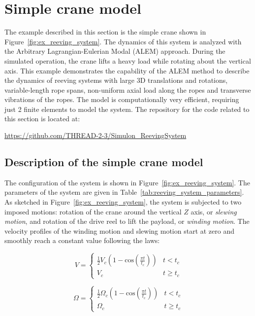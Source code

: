 \section{Simple crane model}\label{sec:craneSimulon}
The example described in this section is the simple crane shown in Figure~\ref{fig:ex_reeving_system}. The dynamics of this system is analyzed with the Arbitrary Lagrangian-Eulerian Modal (ALEM) approach. During the simulated operation, the crane lifts a heavy load while rotating about the vertical axis. This example demonstrates the capability of the ALEM method to describe the dynamics of reeving systems with large 3D translations and rotations, variable-length rope spans, non-uniform axial load along the ropes and transverse vibrations of the ropes. The model is computationally very efficient, requiring just 2 finite elements to model the system. The repository for the code related to this section is located at:
\bi
  \item[] \url{https://github.com/THREAD-2-3/Simulon_ReevingSystem}
\ei

\subsection{Description of the simple crane model}
The configuration of the system is shown in Figure~\ref{fig:ex_reeving_system}. The parameters of the system are given in Table~\ref{tab:reeving_system_parameters}. As sketched in Figure~\ref{fig:ex_reeving_system}, the system is subjected to two imposed motions: rotation of the crane around the vertical $Z$ axis, or \textit{slewing motion}, and rotation of the drive reel to lift the payload, or \textit{winding motion}. The velocity profiles of the winding motion and slewing motion start at zero and smoothly reach a constant value following the laws: 

\begin{equation}
V = \left\{ {\begin{array}{*{20}{c}}
\frac{1}{2}V_c(1-\text{cos}(\frac{\pi t}{t_c}))&t < t_c\\
V_c&t \ge t_c
\end{array}} \right.
 \label{eq:rotation_angle}
\end{equation}


\begin{equation}
\Omega = \left\{ {\begin{array}{*{20}{c}}
\frac{1}{2}\Omega_c(1-\text{cos}(\frac{\pi t}{t_c}))&t < t_c\\
\Omega_c&t \ge t_c
\end{array}} \right.
 \label{eq:rotation_angle}
\end{equation}

